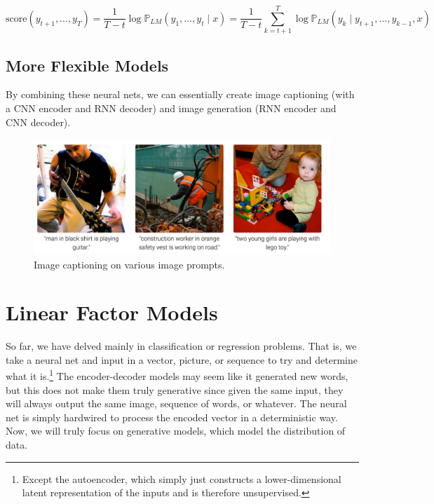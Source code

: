 \documentclass{article}
\begin{document}
      \[\mathrm{score}(y_{t+1}, \ldots, y_T) = \frac{1}{T-t} \log \mathbb{P}_{LM} (y_1, \ldots, y_t \mid x) = \frac{1}{T-t} \sum_{k=t+1}^T \log \mathbb{P}_{LM} ( y_k \mid y_{t+1}, \ldots, y_{k-1}, x) \]

  \subsection{More Flexible Models} 

    By combining these neural nets, we can essentially create image captioning (with a CNN encoder and RNN decoder) and image generation (RNN encoder and CNN decoder). 

    \begin{figure}[H]
      \centering 
      \includegraphics[scale=0.2]{img/05_Encoder_Decoder/image_captioning.png}
      \caption{Image captioning on various image prompts. } 
      \label{fig:image_captioning}
    \end{figure}

\section{Linear Factor Models}

  So far, we have delved mainly in classification or regression problems. That is, we take a neural net and input in a vector, picture, or sequence to try and determine what it is.\footnote{Except the autoencoder, which simply just constructs a lower-dimensional latent representation of the inputs and is therefore unsupervised.} The encoder-decoder models may seem like it generated new words, but this does not make them truly generative since given the same input, they will always output the same image, sequence of words, or whatever. The neural net is simply hardwired to process the encoded vector in a deterministic way. Now, we will truly focus on generative models, which model the distribution of data. 
\end{document}
